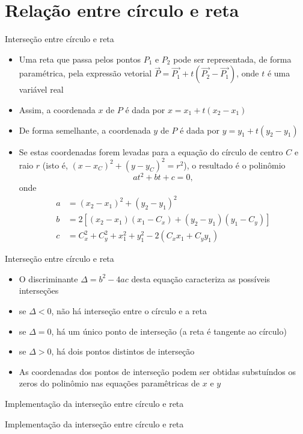 \section{Relação entre círculo e reta}

\begin{frame}[fragile]{Interseção entre círculo e reta}

    \begin{itemize}
        \item Uma reta que passa pelos pontos $P_1$ e $P_2$ pode ser representada, de forma 
            paramétrica, pela expressão vetorial $\vec{P} = \vec{P_1} + t(\vec{P_2} - \vec{P_1})$, 
            onde $t$ é uma variável real

        \item Assim, a coordenada $x$ de $P$ é dada por $x = x_1 + t(x_2 - x_1)$

        \item De forma semelhante, a coordenada $y$ de $P$ é dada por $y = y_1 + t(y_2 - y_1)$

        \item Se estas coordenadas forem levadas para a equação do círculo de centro $C$ e raio $r$
         (isto é, $(x - x_C)^2 + (y - y_C)^2 = r^2$), o resultado é o polinômio 
        \[
            at^2 + bt + c = 0,
        \]
        onde
        \begin{align*}
            a &= (x_2 - x_1)^2 + (y_2 - y_1)^2 \\
            b &= 2\left[(x_2 - x_1)(x_1 - C_x) + (y_2 - y_1)(y_1 - C_y)\right] \\
            c &= C_x^2 + C_y^2 + x_1^2 + y_1^2 - 2(C_xx_1 + C_yy_1)
        \end{align*}

    \end{itemize}

\end{frame}

\begin{frame}[fragile]{Interseção entre círculo e reta}

    \begin{itemize}
        \item O discriminante $\Delta = b^2 - 4ac$  desta equação caracteriza as possíveis 
            interseções

        \item se $\Delta < 0$, não há interseção entre o círculo e a reta
        \item se $\Delta = 0$, há um único ponto de interseção (a reta é tangente ao círculo)
        \item se $\Delta > 0$, há dois pontos distintos de interseção

        \item As coordenadas dos pontos de interseção podem ser obtidas substuíndos os zeros
            do polinômio nas equações paramêtricas de $x$ e $y$
    \end{itemize}

\end{frame}

\begin{frame}[fragile]{Implementação da interseção entre círculo e reta}
\end{frame}

\begin{frame}[fragile]{Implementação da interseção entre círculo e reta}
\end{frame}
